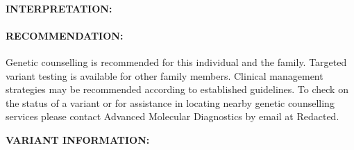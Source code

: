\documentclass[10pt]{extarticle}
\newcommand{\data}[1]{}
\begin{document}
\paragraph{INTERPRETATION:} \data{summary_blurb}

\paragraph{RECOMMENDATION:} Genetic counselling is recommended for this individual and the family. Targeted variant testing is available for other family members. Clinical management strategies may be recommended according to established guidelines. To check on the status of a variant or for assistance in locating nearby genetic counselling services please contact Advanced Molecular Diagnostics by email at Redacted.

{\bf VARIANT INFORMATION:}\\
\data{blurb}


\end{document}
